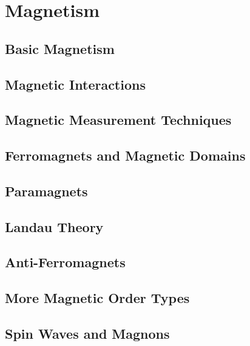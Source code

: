 \chapter{Magnetism}
\label{chapt1}

\section{Basic Magnetism}

\section{Magnetic Interactions}

\section{Magnetic Measurement Techniques}

\section{Ferromagnets and Magnetic Domains}

\section{Paramagnets}

\section{Landau Theory}

\section{Anti-Ferromagnets}

\section{More Magnetic Order Types}

\section{Spin Waves and Magnons}
